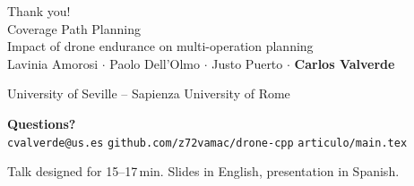 \documentclass[aspectratio=169,10pt]{beamer}
\begin{document}
\begin{frame}
  \centering
  \vspace{0.4cm}
  {\Huge Thank you!}\\[0.2cm]
  {\large Coverage Path Planning}\\[0.1cm]
  {\normalsize Impact of drone endurance on multi-operation planning}\\[0.4cm]
  {\small Lavinia Amorosi \;$\cdot$\; Paolo Dell'Olmo \;$\cdot$\; Justo Puerto \;$\cdot$\; \textbf{Carlos Valverde}}\\[0.08cm]
  {\scriptsize University of Seville -- Sapienza University of Rome \par}
  \vspace{0.4cm}
  {\small \textbf{Questions?}}\\[0.15cm]
  {\scriptsize \texttt{cvalverde@us.es} \;\textperiodcentered\; \texttt{github.com/z72vamac/drone-cpp} \;\textperiodcentered\; \texttt{articulo/main.tex}}\\[0.1cm]
  {\tiny \color{gray} Talk designed for 15--17\,min. Slides in English, presentation in Spanish. \par}
\end{frame}

\end{document}
